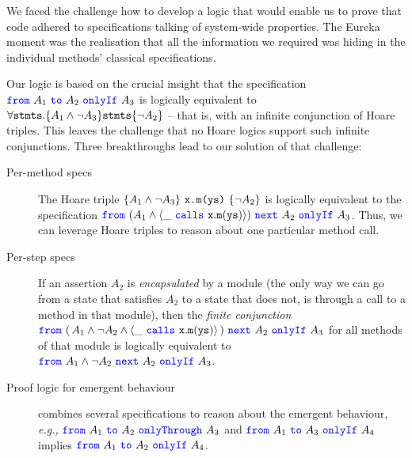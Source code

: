 We faced the challenge  how to develop a logic that would enable us to prove that code 
 adhered to  specifications {talking of system-wide properties.} The Eureka moment was the realisation that all the information we required was hiding  { in the individual methods' classical specifications.}
%

 {Our logic %
 is based on the crucial insight that the specification ${\color{blue}\texttt{from}}\ A_1\ {\color{blue}\texttt{to}}\ A_2\ {\color{blue}\texttt{onlyIf}}\ A_3$ is 
logically equivalent
{to}
 $\forall {\texttt{stmts}}. \{ A_1 \wedge \neg A_3\} {\texttt{stmts}} \{ \neg A_2 \}$ -- that is,
 with an infinite conjunction  of Hoare triples.}
 {This leaves the challenge that no Hoare logics support such infinite conjunctions.
 Three breakthroughs lead to our solution of that challenge:}
 \begin{description}
 \item
 [Per-method specs] 
  The Hoare triple 
$ \{ A_1 \wedge \neg A_3 \} \ {\texttt{x.m(ys)}}\  \{ \neg A_2 \}$ is logically equivalent 
 {to}
the specification
$ {\color{blue}\texttt{from}}\ (A_1 \wedge {\langle \_\ {\color{blue}\texttt{calls}}\ {\texttt{x}}.{\texttt{m}}({\texttt{ys}}) \rangle } )\ {\color{blue}\texttt{next}}\ A_2\ {\color{blue}\texttt{onlyIf}}\ A_3$. %
Thus, we can  leverage Hoare triples to reason about one particular method call.  
 
 \item 
 [Per-step specs] %
 If an assertion $A_2$  is \emph{encapsulated} by a module (\ie the only way we can go from a 
 state that satisfies $A_2$ to a state that does not, is through a call to a method in that module), then
{the
\emph{finite conjunction}
 $ {\color{blue}\texttt{from}}\ (\, A_1 \wedge \neg A_2 \wedge {\langle \_\ {\color{blue}\texttt{calls}}\ {\texttt{x}}.{\texttt{m}}({\texttt{ys}}) \rangle}\, )\ {\color{blue}\texttt{next}}\ A_2\ {\color{blue}\texttt{onlyIf}}\ A_3$
 for all methods of that module is logically equivalent 
 {to}
 $ {\color{blue}\texttt{from}}\ A_1 \wedge \neg A_2\ {\color{blue}\texttt{next}}\  A_2\ {\color{blue}\texttt{onlyIf}}\ A_3$. }
  \item [Proof logic  for emergent behaviour] %
  combines several specifications to reason about the
  emergent behaviour, \emph{e.g.,} 
   $ {\color{blue}\texttt{from}}\ A_1\ {\color{blue}\texttt{to}}\ A_2\ {\color{blue}\texttt{onlyThrough}}\ A_3$  and $ {\color{blue}\texttt{from}}\ A_1\ {\color{blue}\texttt{to}}\ A_3\ {\color{blue}\texttt{onlyIf}}\ A_4$ implies 
   $ {\color{blue}\texttt{from}}\ A_1\ {\color{blue}\texttt{to}}\ A_2\ {\color{blue}\texttt{onlyIf}}\ A_4$.
 \end{description}
 

